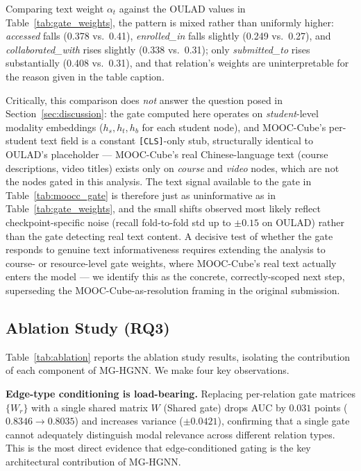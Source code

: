 \documentclass[sigconf,review]{acmart}
\begin{document}
Comparing text weight $\alpha_t$ against the OULAD
values in Table~\ref{tab:gate_weights}, the pattern is
mixed rather than uniformly higher: \textit{accessed}
falls (0.378 vs.\ 0.41), \textit{enrolled\_in} falls
slightly (0.249 vs.\ 0.27), and \textit{collaborated\_with}
rises slightly (0.338 vs.\ 0.31); only
\textit{submitted\_to} rises substantially (0.408 vs.\
0.31), and that relation's weights are uninterpretable
for the reason given in the table caption.

Critically, this comparison does \emph{not} answer the
question posed in Section~\ref{sec:discussion}: the
gate computed here operates on \emph{student}-level
modality embeddings ($h_s, h_t, h_b$ for each student
node), and MOOC-Cube's per-student text field is a
constant \texttt{[CLS]}-only stub, structurally
identical to OULAD's placeholder --- MOOC-Cube's real
Chinese-language text (course descriptions, video
titles) exists only on \emph{course} and \emph{video}
nodes, which are not the nodes gated in this analysis.
The text signal available to the gate in
Table~\ref{tab:moocc_gate} is therefore just as
uninformative as in Table~\ref{tab:gate_weights}, and
the small shifts observed most likely reflect
checkpoint-specific noise (recall fold-to-fold std up
to $\pm 0.15$ on OULAD) rather than the gate detecting
real text content. A decisive test of whether the gate
responds to genuine text informativeness requires
extending the analysis to course- or resource-level
gate weights, where MOOC-Cube's real text actually
enters the model --- we identify this as the concrete,
correctly-scoped next step, superseding the
MOOC-Cube-as-resolution framing in the original
submission.

\subsection{Ablation Study (RQ3)}
\label{sec:ablation}

Table~\ref{tab:ablation} reports the ablation study
results, isolating the contribution of each component
of MG-HGNN. We make four key observations.

\textbf{Edge-type conditioning is load-bearing.}
Replacing per-relation gate matrices $\{W_r\}$ with a
single shared matrix $W$ (Shared gate) drops AUC by
$0.031$ points ($0.8346 \to 0.8035$) and increases
variance ($\pm 0.0421$), confirming that a single gate
cannot adequately distinguish modal relevance across
different relation types. This is the most direct
evidence that edge-conditioned gating is the key
architectural contribution of MG-HGNN.
\end{document}
